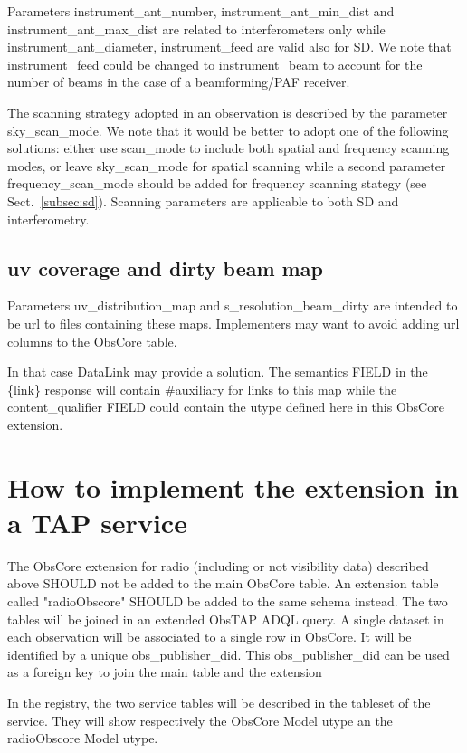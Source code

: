 \documentclass[11pt,a4paper]{ivoa}
\begin{document}
Parameters instrument\_ant\_number, instrument\_ant\_min\_dist and instrument\_ant\_max\_dist are related to interferometers only while instrument\_ant\_diameter, instrument\_feed are valid also for SD.
We note that instrument\_feed could be changed to instrument\_beam to account for the number of beams in the case of a beamforming/PAF receiver.

The scanning strategy adopted in an observation is described by the parameter sky\_scan\_mode. We note that it would be better to adopt one of the following solutions: either use scan\_mode to include both spatial and frequency scanning modes, or leave sky\_scan\_mode for spatial scanning while a second parameter frequency\_scan\_mode should be added for frequency scanning stategy (see Sect.~\ref{subsec:sd}). 
Scanning parameters are applicable to both SD and interferometry.


\subsection{uv coverage and dirty beam map}

Parameters uv\_distribution\_map  and s\_resolution\_beam\_dirty are  intended to be url to 
files containing these maps. 
Implementers may want to avoid adding url columns to the ObsCore table. 

In that case DataLink \citep{2015ivoa.spec.0617D} may provide a solution. The semantics FIELD in the 
\{link\} response  will contain \#auxiliary  for links to this map while  the content\_qualifier 
FIELD could contain the utype defined here in this ObsCore extension.


\section{How to implement the extension in a TAP service}

The ObsCore extension for radio (including or not visibility data) described above SHOULD not be added to the main ObsCore table. An extension table called "radioObscore" SHOULD be added to the same schema instead. The two tables will be joined in an extended ObsTAP ADQL query. A single dataset in each observation will be associated to a single row in ObsCore. It will be identified by a unique obs\_publisher\_did. This obs\_publisher\_did can be used as a foreign key to join the main table and the extension

In the registry, the two service tables will be described in the tableset of the service. They will show respectively the ObsCore Model utype an the radioObscore Model utype. 
\end{document}
